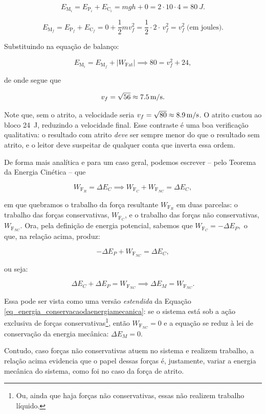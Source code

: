 \begin{enumerate}
\[
  E_{\text{M}_i} = E_{\text{P}_i} + E_{\text{C}_i}  = mgh + 0 = 2 \cdot 10 \cdot 4
  = \SI{80}{J}.
\]

\[
  E_{\text{M}_f} = E_{\text{P}_f} + E_{\text{C}_f}  = 0 + \dfrac{1}{2}mv_f^2
  = \dfrac{1}{2} \cdot 2 \cdot \,v_f^2 = v_f^2 \;\text{(em joules).}
\]

Substituindo na equação de balanço:

\[
  E_{\text{M}_i} = E_{\text{M}_f} + |W_{\text{Fat}}| \implies 80 = v_f^2 + 24,
\]

\noindent de onde segue que 

 $$v_f = \sqrt{56} \approx \SI{7{,}5}{m/s}.$$


Note que, sem o atrito, a velocidade seria $v_f = \sqrt{80}
\approx \SI{8{,}9}{m/s}$. O atrito custou ao bloco 
\SI{24}{J}, reduzindo a velocidade
final. Esse contraste é uma boa verificação qualitativa: o resultado
com atrito \emph{deve} ser sempre menor do que o resultado sem atrito,
e o leitor deve suspeitar de qualquer conta que inverta essa ordem.

De forma mais analítica e para um caso geral, podemos escrever -- pelo Teorema da Energia Cinética -- que

$$ W_{\text{F}_R} = \Delta E_C \implies W_{\text{F}_{C}} + W_{\text{F}_{NC}} = \Delta E_C,  $$

\noindent em que quebramos o trabalho da força resultante $W_{\text{F}_R}$ em duas parcelas: o trabalho das forças conservativas, $W_{\text{F}_{C}}$, e o trabalho das forças não conservativas, $W_{\text{F}_{NC}}$. Ora, pela definição de energia potencial, sabemos que $W_{\text{F}_{C}} = - \Delta E_P,$ o que, na relação acima, produz:

$$ -\Delta E_P + W_{\text{F}_{NC}} = \Delta E_C,  $$

\noindent ou seja:

$$ \Delta E_C + \Delta E_P = W_{\text{F}_{NC}} \implies \boxed{\Delta E_M = W_{\text{F}_{NC}}.} $$

Essa pode ser vista como uma versão \emph{estendida} da Equação \eqref{eq_energia_conservacaodaenergiamecanica}: se o sistema está sob a ação exclusiva de forças conservativas\footnote{Ou, ainda que haja forças não conservativas, essas não realizem trabalho líquido.}, então $W_{\text{F}_{NC}} =0$ e a equação se reduz à lei de conservação da energia mecânica: $\Delta E_M = 0.$

Contudo, caso forças não conservativas atuem no sistema e realizem trabalho, a relação acima evidencia que o papel dessas forças é, justamente, variar a energia mecânica do sistema, como foi no caso da força de atrito.



\end{enumerate}
